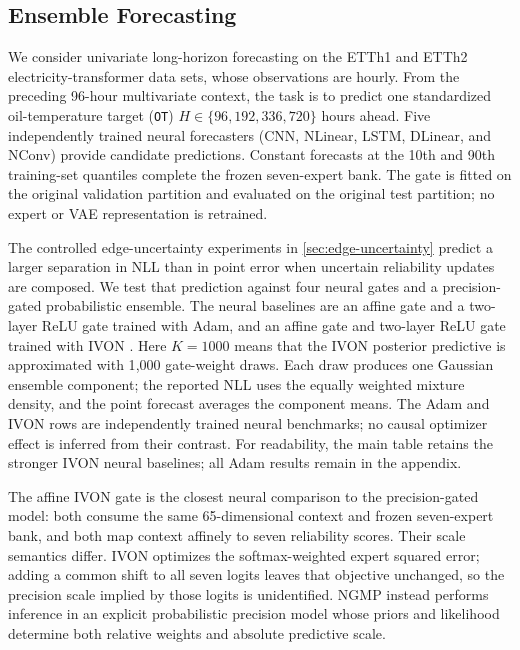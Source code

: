 \subsection{Ensemble Forecasting}

We consider univariate long-horizon forecasting on the ETTh1 and ETTh2
electricity-transformer data sets, whose observations are hourly.  From the
preceding 96-hour multivariate context, the task is to predict one standardized
oil-temperature target (\texttt{OT}) $H\in\{96,192,336,720\}$ hours ahead.
Five independently trained neural forecasters (CNN, NLinear, LSTM, DLinear,
and NConv) provide candidate predictions.  Constant forecasts at the 10th and
90th training-set quantiles complete the frozen seven-expert bank.  The gate is
fitted on the original validation partition and evaluated on the original test
partition; no expert or VAE representation is retrained.

The controlled edge-uncertainty experiments in \cref{sec:edge-uncertainty}
predict a larger separation in NLL than in point error when
uncertain reliability updates are composed.  We test that prediction against
four neural gates and a precision-gated probabilistic ensemble.  The neural
baselines are an affine gate and a two-layer ReLU gate trained with Adam, and
an affine gate and two-layer ReLU gate trained with IVON
\citep{shen_variational_2024}. Here $K=1000$ means that the IVON posterior
predictive is approximated with 1{,}000 gate-weight draws. Each draw produces
one Gaussian ensemble component; the reported NLL uses the equally weighted
mixture density, and the point forecast averages the component means.
The Adam and IVON rows are independently trained neural benchmarks; no causal
optimizer effect is inferred from their contrast.  For readability, the main
table retains the stronger IVON neural baselines; all Adam results remain in
the appendix.

The affine IVON gate is the closest neural comparison to the precision-gated
model: both consume the same 65-dimensional context and frozen seven-expert
bank, and both map context affinely to seven reliability scores.  Their scale
semantics differ.  IVON optimizes the softmax-weighted expert squared error;
adding a common shift to all seven logits leaves that objective unchanged, so
the precision scale implied by those logits is unidentified.  NGMP instead
performs inference in an explicit probabilistic precision model whose priors
and likelihood determine both relative weights and absolute predictive scale.


